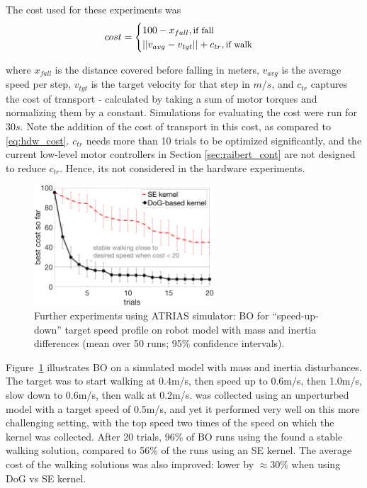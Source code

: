 The cost used for these experiments was
\begin{equation}
\label{eq:cost_sim}
cost = 		
    \begin{cases}
		100 - x_{fall} , \text{\small{if fall}} \\
		||v_{avg} - v_{tgt}|| + c_{tr}, \text{\small{if walk}}\\
	\end{cases}
\end{equation}

where $x_{fall}$ is the distance covered before falling in meters, $v_{avg}$ is the average speed per step, $v_{tgt}$ is the target velocity for that step in $m/s$, and $c_{tr}$ captures the cost of transport - calculated by taking a sum of motor torques and normalizing them by a constant. Simulations for evaluating the cost were run for $30s$. Note the addition of the cost of transport in this cost, as compared to \ref{eq:hdw_cost}. $c_{tr}$ needs more than 10 trials to be optimized significantly, and the current low-level motor controllers in Section \ref{sec:raibert_cont} are not designed to reduce $c_{tr}$. Hence, its not considered in the hardware experiments.

\begin{figure}[t]
\centering
\includegraphics[width=0.6\textwidth]{img/sim_raibert_9d_speedupdown_disturbed_15.png}
\caption{\small{Further experiments using ATRIAS simulator: BO for ``speed-up-down'' target speed profile on robot model with mass and inertia differences
(mean over 50 runs; 95\% confidence intervals).}}
\label{fig:sim_9d_disturb}
\end{figure}

Figure~\ref{fig:sim_9d_disturb} illustrates BO on a simulated model with mass and inertia disturbances. The target was to start walking at 0.4m/s, then speed up to 0.6m/s, then 1.0m/s, slow down to 0.6m/s, then walk at 0.2m/s. \dogkernel was collected using an unperturbed model with a target speed of 0.5m/s, and yet it performed very well on this more challenging setting, with the top speed two times of the speed on which the kernel was collected. After 20 trials, 96\% of BO runs using the \dogkernel found a stable walking solution, compared to 56\% of the runs using an SE kernel. The average cost of the walking solutions was also improved: lower by $\approx$30\% when using DoG vs SE kernel.

